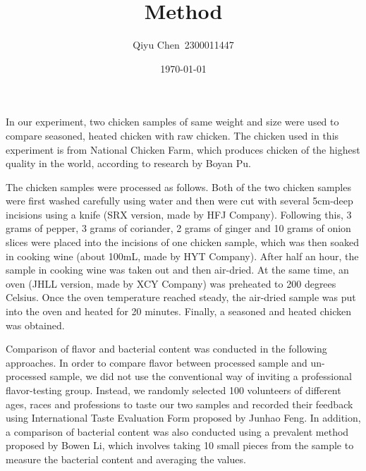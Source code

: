 \documentclass[a4paper,11pt]{article}
\title{Method}
\author{Qiyu Chen\,\,\,2300011447}
\date{\today}
\begin{document}
	\maketitle
	In our experiment, two chicken samples of same weight and size were used to compare seasoned, heated chicken with raw chicken. The chicken used in this experiment is from National Chicken Farm, which produces chicken of the highest quality in the world, according to research by Boyan Pu\cite{pby}. 
	
	The chicken samples were processed as follows. Both of the two chicken samples were first washed carefully using water and then were cut with several 5cm-deep incisions using a knife (SRX version, made by HFJ Company). Following this, 3 grams of pepper, 3 grams of coriander, 2 grams of ginger and 10 grams of onion slices were placed into the incisions of one chicken sample, which was then soaked in cooking wine (about 100mL, made by HYT Company). After half an hour, the sample in cooking wine was taken out and then air-dried. At the same time, an oven (JHLL version, made by XCY Company) was preheated to 200 degrees Celsius. Once the oven temperature reached steady, the air-dried sample was put into the oven and heated for 20 minutes. Finally, a seasoned and heated chicken was obtained.
	
	Comparison of flavor and bacterial content was conducted in the following approaches. In order to compare flavor between processed sample and un-processed sample, we did not use the conventional way of inviting a professional flavor-testing group\cite{zxh}. Instead, we randomly selected 100 volunteers of different ages, races and professions to taste our two samples and recorded their feedback using International Taste Evaluation Form proposed by Junhao Feng\cite{fjh}. In addition, a comparison of bacterial content was also conducted using a prevalent method proposed by Bowen Li\cite{lbw}, which involves taking 10 small pieces from the sample to measure the bacterial content and averaging the values. 
	
	
	
\end{document}
